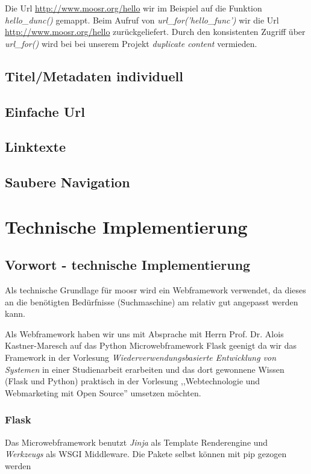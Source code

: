 \documentclass[11pt]{scrreprt}
\begin{document}
Die Url \url{http://www.moosr.org/hello} wir im Beispiel auf die Funktion
\emph{hello\_dunc()} gemappt. Beim Aufruf von \emph{url\_for('hello\_func')} wir
die Url \url{http://www.moosr.org/hello} zurückgeliefert. Durch den konsistenten
Zugriff über \emph{url\_for()} wird bei bei unserem Projekt
\emph{duplicate content} vermieden.


\section{Titel/Metadaten individuell}
\section{Einfache Url}
\section{Linktexte}
\section{Saubere Navigation}


\chapter{Technische Implementierung}
\section{Vorwort - technische Implementierung}
Als technische Grundlage für moosr wird ein Webframework verwendet, da dieses an
die benötigten Bedürfnisse (Suchmaschine) am relativ gut angepasst werden kann.

Als Webframework haben wir uns mit Absprache mit Herrn Prof. Dr. Alois
Kastner-Maresch auf das Python Microwebframework Flask geenigt da wir das
Framework in der Vorlesung \emph{Wiederverwendungsbasierte Entwicklung von
Systemen} in einer Studienarbeit erarbeiten und das dort gewonnene Wissen (Flask
und Python) praktisch in der Vorlesung ,,Webtechnologie und Webmarketing 
mit Open Source'' umsetzen möchten.

\subsection{Flask}
Das Microwebframework benutzt \emph{Jinja} als Template Renderengine und
\emph{Werkzeugs} als WSGI Middleware. Die Pakete selbst können mit pip gezogen
werden
\end{document}
